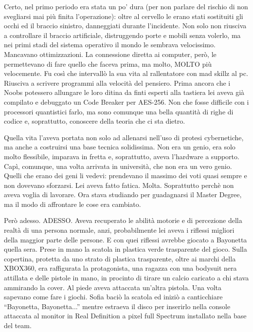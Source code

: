     Certo, nel primo periodo era stata un po' dura (per non parlare del
    rischio di non svegliarsi mai più finita l'operazione): oltre al
    cervello le erano stati sostituiti gli occhi ed il braccio sinistro,
    danneggiati durante l'incidente. Non solo non riusciva a controllare il
    braccio artificiale, distruggendo porte e mobili senza volerlo, ma nei
    primi stadi del sistema operativo il mondo le sembrava velocissimo.
    Mancavano ottimizzazioni. La connessione diretta ai computer, però, le
    permettevano di fare quello che faceva prima, ma molto, MOLTO più
    velocemente. Fu così che intervallò la sua vita al rallentatore con mad
    skillz al pc. Riusciva a scrivere programmi alla velocità del pensiero.
    Prima ancora che i Noobs potessero allungare le loro ditina da finti
    esperti alla tastiera lei aveva già compilato e debuggato un Code
    Breaker per AES-256. Non che fosse difficile con i processori
    quantistici farlo, ma sono comunque una bella quantità di righe di
    codice e, soprattutto, conoscere della teoria che ci sta dietro.

    Quella vita l'aveva portata non solo ad allenarsi nell'uso di protesi
    cybernetiche, ma anche a costruirsi una base tecnica solidissima. Non
    era un genio, era solo molto flessibile, imparava in fretta e,
    soprattutto, aveva l'hardware a supporto. Capì, comunque, una volta
    arrivata in università, che non era un vero genio. Quelli che erano dei
    geni li vedevi: prendevano il massimo dei voti quasi sempre e non
    dovevano sforzarsi. Lei aveva fatto fatica. Molta. Soprattutto perchè
    non aveva voglia di lavorare. Ora stava studiando per guadagnarsi il
    Master Degree, ma il modo di affrontare le cose era cambiato.

    Però adesso. ADESSO. Aveva recuperato le abilità motorie e di
    percezione della realtà di una persona normale, anzi, probabilmente lei
    aveva i riflessi migliori della maggior parte delle persone. E con quei
    riflessi avrebbe giocato a Bayonetta quella sera. Prese in mano la
    scatola in plastica verde trasparente del gioco. Sulla copertina,
    protetta da uno strato di plastica trasparente, oltre ai marchi della
    XBOX360, era raffigurata la protagonista, una ragazza con una bodysuit
    nera attillata e delle pistole in mano, in procinto di tirare un calcio
    caricato a chi stava ammirando la cover. Al piede aveva attaccata
    un'altra pistola. Una volta sapevano come fare i giochi. Sofia baciò la
    scatola ed iniziò a canticchiare ``Bayonetta, Bayonetta...'' mentre
    estraeva il disco per inserirlo nella console attaccata al monitor in
    Real Definition a pixel full Spectrum installato nella base del team.

